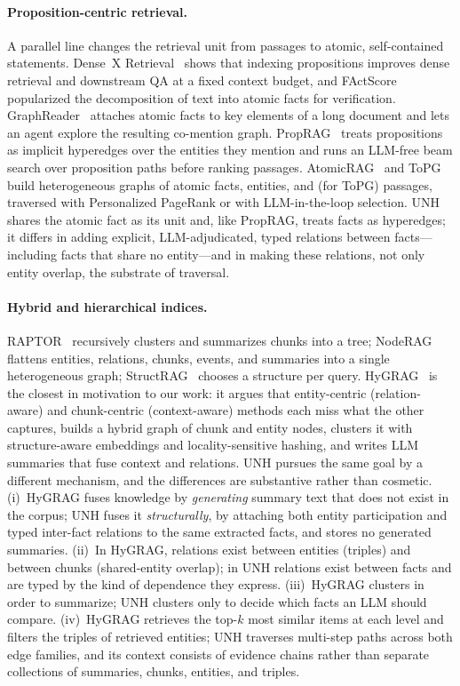 \documentclass[runningheads]{llncs}
\newcommand{\sys}{UNH}
\begin{document}
\paragraph{Proposition-centric retrieval.}
A parallel line changes the retrieval unit from passages to atomic, self-contained statements. Dense~X Retrieval~\cite{chen2024dense} shows that indexing propositions improves dense retrieval and downstream QA at a fixed context budget, and FActScore~\cite{min2023factscore} popularized the decomposition of text into atomic facts for verification. GraphReader~\cite{li2024graphreader} attaches atomic facts to key elements of a long document and lets an agent explore the resulting co-mention graph. PropRAG~\cite{wang2025proprag} treats propositions as implicit hyperedges over the entities they mention and runs an LLM-free beam search over proposition paths before ranking passages. AtomicRAG~\cite{hou2026atomicrag} and ToPG~\cite{delmas2026topg} build heterogeneous graphs of atomic facts, entities, and (for ToPG) passages, traversed with Personalized PageRank or with LLM-in-the-loop selection. \sys{} shares the atomic fact as its unit and, like PropRAG, treats facts as hyperedges; it differs in adding explicit, LLM-adjudicated, typed relations between facts---including facts that share no entity---and in making these relations, not only entity overlap, the substrate of traversal.

\paragraph{Hybrid and hierarchical indices.}
RAPTOR~\cite{sarthi2024raptor} recursively clusters and summarizes chunks into a tree; NodeRAG~\cite{xu2025noderag} flattens entities, relations, chunks, events, and summaries into a single heterogeneous graph; StructRAG~\cite{li2024structrag} chooses a structure per query. HyGRAG~\cite{zhong2026hygrag} is the closest in motivation to our work: it argues that entity-centric (relation-aware) and chunk-centric (context-aware) methods each miss what the other captures, builds a hybrid graph of chunk and entity nodes, clusters it with structure-aware embeddings and locality-sensitive hashing, and writes LLM summaries that fuse context and relations. \sys{} pursues the same goal by a different mechanism, and the differences are substantive rather than cosmetic. (i)~HyGRAG fuses knowledge by \emph{generating} summary text that does not exist in the corpus; \sys{} fuses it \emph{structurally}, by attaching both entity participation and typed inter-fact relations to the same extracted facts, and stores no generated summaries. (ii)~In HyGRAG, relations exist between entities (triples) and between chunks (shared-entity overlap); in \sys{} relations exist between facts and are typed by the kind of dependence they express. (iii)~HyGRAG clusters in order to summarize; \sys{} clusters only to decide which facts an LLM should compare. (iv)~HyGRAG retrieves the top-$k$ most similar items at each level and filters the triples of retrieved entities; \sys{} traverses multi-step paths across both edge families, and its context consists of evidence chains rather than separate collections of summaries, chunks, entities, and triples.
\end{document}

